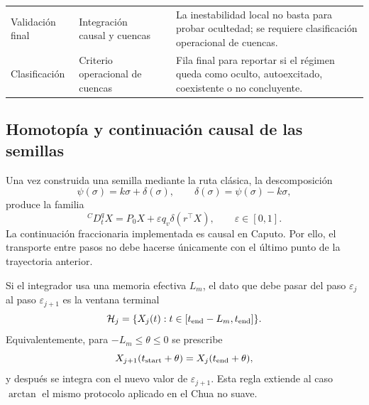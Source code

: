 \documentclass[journal]{IEEEtran}
\begin{document}
\begin{table}[htbp]
\begin{adjustbox}{max width=\textwidth}
\begin{tabular}{@{}L{2.7cm}L{3.4cm}L{4.4cm}L{5.8cm}@{}}
Validación final &
Integración causal y cuencas &
 &
La inestabilidad local no basta para probar ocultedad; se requiere clasificación operacional de cuencas. \\

Clasificación &
Criterio operacional de cuencas &
 &
Fila final para reportar si el régimen queda como oculto, autoexcitado, coexistente o no concluyente. \\

\bottomrule
\end{tabular}
\end{adjustbox}
\end{table}

\subsection{Homotopía y continuación causal de las semillas}



Una vez construida una semilla mediante la ruta clásica, la
descomposición
\begin{equation}
\label{eq:delta_arctan}
\psi(\sigma)=k\sigma+\delta(\sigma),
\qquad
\delta(\sigma)=\psi(\sigma)-k\sigma,
\end{equation}
produce la familia
\begin{equation}
\label{eq:homotopy_caputo_arctan}
{}^{C}D_t^qX=P_0X+\varepsilon q_v\delta(r^\top X),
\qquad \varepsilon\in[0,1].
\end{equation}
La continuación fraccionaria implementada es causal en Caputo. Por ello,
el transporte entre pasos no debe hacerse únicamente con el último punto de
la trayectoria anterior.

Si el integrador usa una memoria efectiva $L_m$, el dato que debe pasar del
paso $\varepsilon_j$ al paso $\varepsilon_{j+1}$ es la ventana terminal
\begin{equation}
\label{eq:history_window_arctan}
\mathcal H_j=\{X_j(t):t\in[t_{\rm end}-L_m,t_{\rm end}]\}.
\end{equation}
Equivalentemente, para $-L_m\leq\theta\leq0$ se prescribe
\begin{equation}
\label{eq:history_transfer_arctan}
X_{j+1}(t_{\rm start}+\theta)=X_j(t_{\rm end}+\theta),
\end{equation}
y después se integra con el nuevo valor de $\varepsilon_{j+1}$. Esta regla
extiende al caso $\arctan$ el mismo protocolo aplicado en el Chua no suave.
\end{document}
